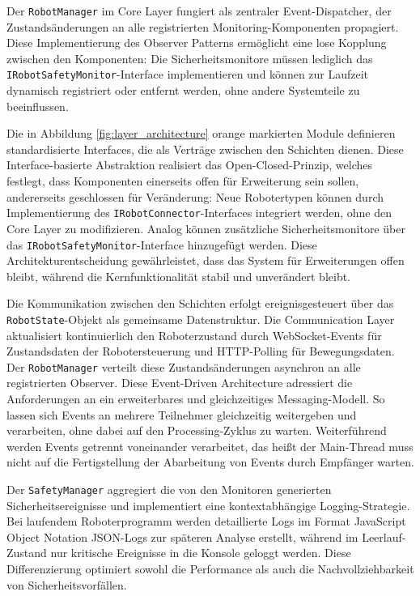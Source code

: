 Der \texttt{RobotManager} im Core Layer fungiert als zentraler
Event-Dispatcher, der Zustandsänderungen an alle registrierten
Monitoring-Komponenten propagiert. Diese Implementierung des Observer Patterns
ermöglicht eine lose Kopplung zwischen den
Komponenten: Die Sicherheitsmonitore müssen
lediglich das \texttt{IRobotSafetyMonitor}-Interface implementieren und können
zur Laufzeit dynamisch registriert oder entfernt werden, ohne andere Systemteile
zu beeinflussen.

Die in Abbildung \ref{fig:layer_architecture}
orange markierten Module definieren standardisierte Interfaces, die als Verträge
zwischen den Schichten dienen. Diese Interface-basierte Abstraktion realisiert
das Open-Closed-Prinzip, welches festlegt, dass Komponenten einerseits offen
für Erweiterung sein sollen, andererseits geschlossen für
Veränderung: Neue Robotertypen können durch Implementierung
des \texttt{IRobotConnector}-Interfaces integriert werden, ohne den Core Layer
zu modifizieren. Analog können zusätzliche Sicherheitsmonitore über das
\texttt{IRobotSafetyMonitor}-Interface hinzugefügt werden. Diese
Architekturentscheidung gewährleistet, dass das System für Erweiterungen offen
bleibt, während die Kernfunktionalität stabil und unverändert bleibt.

Die Kommunikation zwischen den Schichten erfolgt ereignisgesteuert über das
\texttt{RobotState}-Objekt als gemeinsame Datenstruktur. Die Communication Layer
aktualisiert kontinuierlich den Roboterzustand durch WebSocket-Events für
Zustandsdaten der Robotersteuerung und HTTP-Polling für
Bewegungsdaten. Der \texttt{RobotManager}
verteilt diese Zustandsänderungen asynchron an alle registrierten Observer.
Diese Event-Driven Architecture adressiert die Anforderungen an ein
erweiterbares und gleichzeitiges Messaging-Modell. So lassen sich Events
an mehrere Teilnehmer gleichzeitig weitergeben und verarbeiten, ohne dabei auf
den Processing-Zyklus zu warten. Weiterführend werden Events getrennt
voneinander verarbeitet, das heißt der Main-Thread muss nicht auf die
Fertigstellung der Abarbeitung von Events durch Empfänger
warten.

Der \texttt{SafetyManager} aggregiert die von den Monitoren generierten
Sicherheitsereignisse und implementiert eine kontextabhängige Logging-Strategie.
Bei laufendem Roboterprogramm werden detaillierte Logs im Format
JavaScript Object Notation {JSON-Logs} zur späteren Analyse
erstellt, während im Leerlauf-Zustand nur kritische Ereignisse in die Konsole
geloggt werden. Diese Differenzierung optimiert sowohl die Performance als auch
die Nachvollziehbarkeit von Sicherheitsvorfällen.

